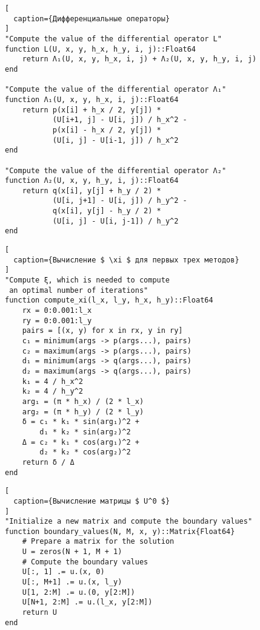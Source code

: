 \newpage

\begin{figure}[h!]
\begin{lstlisting}[
  caption={Дифференциальные операторы}
]
"Compute the value of the differential operator L"
function L(U, x, y, h_x, h_y, i, j)::Float64
    return Λ₁(U, x, y, h_x, i, j) + Λ₂(U, x, y, h_y, i, j)
end

"Compute the value of the differential operator Λ₁"
function Λ₁(U, x, y, h_x, i, j)::Float64
    return p(x[i] + h_x / 2, y[j]) *
           (U[i+1, j] - U[i, j]) / h_x^2 -
           p(x[i] - h_x / 2, y[j]) *
           (U[i, j] - U[i-1, j]) / h_x^2
end

"Compute the value of the differential operator Λ₂"
function Λ₂(U, x, y, h_y, i, j)::Float64
    return q(x[i], y[j] + h_y / 2) *
           (U[i, j+1] - U[i, j]) / h_y^2 -
           q(x[i], y[j] - h_y / 2) *
           (U[i, j] - U[i, j-1]) / h_y^2
end
\end{lstlisting}
\end{figure}

\begin{figure}[h!]
\begin{lstlisting}[
  caption={Вычисление $ \xi $ для первых трех методов}
]
"Compute ξ, which is needed to compute
 an optimal number of iterations"
function compute_xi(l_x, l_y, h_x, h_y)::Float64
    rx = 0:0.001:l_x
    ry = 0:0.001:l_y
    pairs = [(x, y) for x in rx, y in ry]
    c₁ = minimum(args -> p(args...), pairs)
    c₂ = maximum(args -> p(args...), pairs)
    d₁ = minimum(args -> q(args...), pairs)
    d₂ = maximum(args -> q(args...), pairs)
    k₁ = 4 / h_x^2
    k₂ = 4 / h_y^2
    arg₁ = (π * h_x) / (2 * l_x)
    arg₂ = (π * h_y) / (2 * l_y)
    δ = c₁ * k₁ * sin(arg₁)^2 +
        d₁ * k₂ * sin(arg₂)^2
    Δ = c₂ * k₁ * cos(arg₁)^2 +
        d₂ * k₂ * cos(arg₂)^2
    return δ / Δ
end
\end{lstlisting}
\end{figure}

\newpage

\begin{figure}[h!]
\begin{lstlisting}[
  caption={Вычисление матрицы $ U^0 $}
]
"Initialize a new matrix and compute the boundary values"
function boundary_values(N, M, x, y)::Matrix{Float64}
    # Prepare a matrix for the solution
    U = zeros(N + 1, M + 1)
    # Compute the boundary values
    U[:, 1] .= u.(x, 0)
    U[:, M+1] .= u.(x, l_y)
    U[1, 2:M] .= u.(0, y[2:M])
    U[N+1, 2:M] .= u.(l_x, y[2:M])
    return U
end
\end{lstlisting}
\end{figure}

